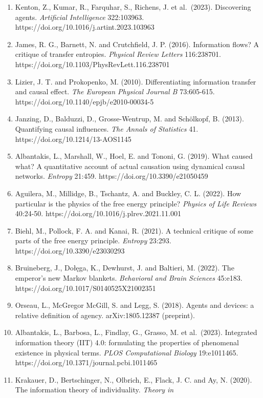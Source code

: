 \documentclass[
  10pt,
]{article}
\begin{document}
\begin{enumerate}
\item
  Kenton, Z., Kumar, R., Farquhar, S., Richens, J. et al.~(2023).
  Discovering agents. \emph{Artificial Intelligence} 322:103963.
  https://doi.org/10.1016/j.artint.2023.103963
\item
  James, R. G., Barnett, N. and Crutchfield, J. P. (2016). Information
  flows? A critique of transfer entropies. \emph{Physical Review
  Letters} 116:238701. https://doi.org/10.1103/PhysRevLett.116.238701
\item
  Lizier, J. T. and Prokopenko, M. (2010). Differentiating information
  transfer and causal effect. \emph{The European Physical Journal B}
  73:605-615. https://doi.org/10.1140/epjb/e2010-00034-5
\item
  Janzing, D., Balduzzi, D., Grosse-Wentrup, M. and Schölkopf, B.
  (2013). Quantifying causal influences. \emph{The Annals of Statistics}
  41. https://doi.org/10.1214/13-AOS1145
\item
  Albantakis, L., Marshall, W., Hoel, E. and Tononi, G. (2019). What
  caused what? A quantitative account of actual causation using
  dynamical causal networks. \emph{Entropy} 21:459.
  https://doi.org/10.3390/e21050459
\item
  Aguilera, M., Millidge, B., Tschantz, A. and Buckley, C. L. (2022).
  How particular is the physics of the free energy principle?
  \emph{Physics of Life Reviews} 40:24-50.
  https://doi.org/10.1016/j.plrev.2021.11.001
\item
  Biehl, M., Pollock, F. A. and Kanai, R. (2021). A technical critique
  of some parts of the free energy principle. \emph{Entropy} 23:293.
  https://doi.org/10.3390/e23030293
\item
  Bruineberg, J., Dołęga, K., Dewhurst, J. and Baltieri, M. (2022). The
  emperor's new Markov blankets. \emph{Behavioral and Brain Sciences}
  45:e183. https://doi.org/10.1017/S0140525X21002351
\item
  Orseau, L., McGregor McGill, S. and Legg, S. (2018). Agents and
  devices: a relative definition of agency. arXiv:1805.12387 (preprint).
\item
  Albantakis, L., Barbosa, L., Findlay, G., Grasso, M. et al.~(2023).
  Integrated information theory (IIT) 4.0: formulating the properties of
  phenomenal existence in physical terms. \emph{PLOS Computational
  Biology} 19:e1011465. https://doi.org/10.1371/journal.pcbi.1011465
\item
  Krakauer, D., Bertschinger, N., Olbrich, E., Flack, J. C. and Ay, N.
  (2020). The information theory of individuality. \emph{Theory in
}
\end{enumerate}
\end{document}
